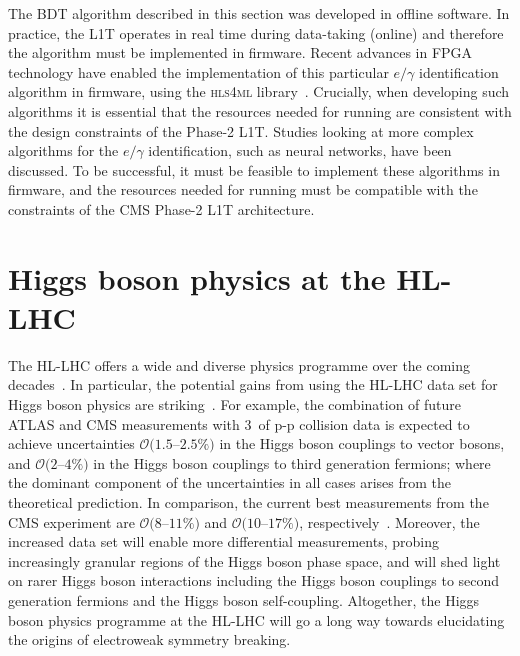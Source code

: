 The BDT algorithm described in this section was developed in offline software. In practice, the L1T operates in real time during data-taking (online) and therefore the algorithm must be implemented in firmware. Recent advances in FPGA technology have enabled the implementation of this particular $e/\gamma$ identification algorithm in firmware, using the \textsc{hls4ml} library~\cite{Duarte_2018}. Crucially, when developing such algorithms it is essential that the resources needed for running are consistent with the design constraints of the Phase-2 L1T. Studies looking at more complex algorithms for the $e/\gamma$ identification, such as neural networks, have been discussed. To be successful, it must be feasible to implement these algorithms in firmware, and the resources needed for running must be compatible with the constraints of the CMS Phase-2 L1T architecture.

\section{Higgs boson physics at the HL-LHC}\label{sec:trilinear}
The HL-LHC offers a wide and diverse physics programme over the coming decades~\cite{Atlas:2019qfx,Bediaga:2018lhg}. In particular, the potential gains from using the HL-LHC data set for Higgs boson physics are striking~\cite{Cepeda:2019klc}. For example, the combination of future ATLAS and CMS measurements with 3~\abinv of p-p collision data is expected to achieve uncertainties $\mathcal{O}(1.5$--$2.5\%)$ in the Higgs boson couplings to vector bosons, and $\mathcal{O}(2$--$4\%)$ in the Higgs boson couplings to third generation fermions; where the dominant component of the uncertainties in all cases arises from the theoretical prediction. In comparison, the current best measurements from the CMS experiment are $\mathcal{O}(8$--$11\%)$ and $\mathcal{O}(10$--$17\%)$, respectively~\cite{Sirunyan:2020two}. Moreover, the increased data set will enable more differential measurements, probing increasingly granular regions of the Higgs boson phase space, and will shed light on rarer Higgs boson interactions including the Higgs boson couplings to second generation fermions and the Higgs boson self-coupling. Altogether, the Higgs boson physics programme at the HL-LHC will go a long way towards elucidating the origins of electroweak symmetry breaking.

